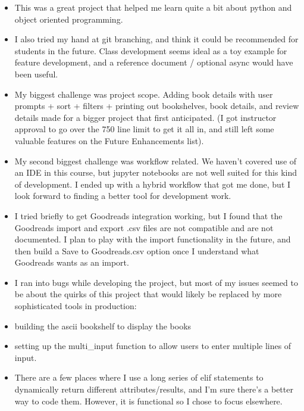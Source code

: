 \documentclass[11pt]{article}
\providecommand{\tightlist}{%
      \setlength{\itemsep}{0pt}\setlength{\parskip}{0pt}}
\begin{document}
\begin{itemize}
\tightlist
\item
  This was a great project that helped me learn quite a bit about python
  and object oriented programming.
\item
  I also tried my hand at git branching, and think it could be
  recommended for students in the future. Class development seems ideal
  as a toy example for feature development, and a reference document /
  optional async would have been useful.
\item
  My biggest challenge was project scope. Adding book details with user
  prompts + sort + filters + printing out bookshelves, book details, and
  review details made for a bigger project that first anticipated. (I
  got instructor approval to go over the 750 line limit to get it all
  in, and still left some valuable features on the Future Enhancements
  list).
\item
  My second biggest challenge was workflow related. We haven't covered
  use of an IDE in this course, but jupyter notebooks are not well
  suited for this kind of development. I ended up with a hybrid workflow
  that got me done, but I look forward to finding a better tool for
  development work.
\item
  I tried briefly to get Goodreads integration working, but I found that
  the Goodreads import and export .csv files are not compatible and are
  not documented. I plan to play with the import functionality in the
  future, and then build a Save to Goodreads.csv option once I
  understand what Goodreads wants as an import.
\item
  I ran into bugs while developing the project, but most of my issues
  seemed to be about the quirks of this project that would likely be
  replaced by more sophisticated tools in production:
\item
  building the ascii bookshelf to display the books
\item
  setting up the multi\_input function to allow users to enter multiple
  lines of input.
\item
  There are a few places where I use a long series of elif statements to
  dynamically return different attributes/results, and I'm sure there's
  a better way to code them. However, it is functional so I chose to
  focus elsewhere.
\end{itemize}


    
    
    
    
\end{document}
